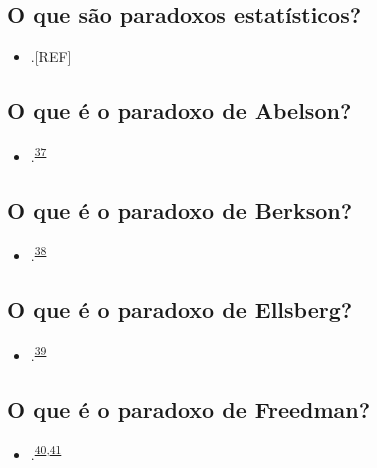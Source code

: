 \documentclass[
  a4paper,
]{book}
\providecommand{\tightlist}{%
  \setlength{\itemsep}{0pt}\setlength{\parskip}{0pt}}
\begin{document}
\hypertarget{o-que-suxe3o-paradoxos-estatuxedsticos}{%
\subsection{O que são paradoxos estatísticos?}\label{o-que-suxe3o-paradoxos-estatuxedsticos}}

\begin{itemize}
\tightlist
\item
  .{[}REF{]}
\end{itemize}

\hypertarget{abelson}{%
\subsection{O que é o paradoxo de Abelson?}\label{abelson}}

\begin{itemize}
\tightlist
\item
  .\textsuperscript{\protect\hyperlink{ref-abelson1985}{37}}
\end{itemize}

\hypertarget{Berkson}{%
\subsection{O que é o paradoxo de Berkson?}\label{Berkson}}

\begin{itemize}
\tightlist
\item
  .\textsuperscript{\protect\hyperlink{ref-berkson1946}{38}}
\end{itemize}

\hypertarget{ellsberg}{%
\subsection{O que é o paradoxo de Ellsberg?}\label{ellsberg}}

\begin{itemize}
\tightlist
\item
  .\textsuperscript{\protect\hyperlink{ref-ellsberg1961}{39}}
\end{itemize}

\hypertarget{freedman}{%
\subsection{O que é o paradoxo de Freedman?}\label{freedman}}

\begin{itemize}
\tightlist
\item
  .\textsuperscript{\protect\hyperlink{ref-freedman1983}{40},\protect\hyperlink{ref-freedman1989}{41}}
\end{itemize}
\end{document}
